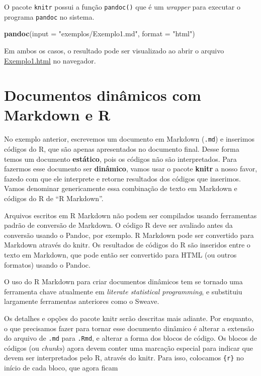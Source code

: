 \documentclass[10pt,a4paper]{book}
\newenvironment{Shaded}{\begin{snugshade}}{\end{snugshade}}
\newcommand{\KeywordTok}[1]{\textcolor[rgb]{0.13,0.29,0.53}{\textbf{#1}}}
\newcommand{\DataTypeTok}[1]{\textcolor[rgb]{0.13,0.29,0.53}{#1}}
\newcommand{\StringTok}[1]{\textcolor[rgb]{0.31,0.60,0.02}{#1}}
\newcommand{\NormalTok}[1]{#1}
\begin{document}
O pacote \texttt{knitr} possui a função \texttt{pandoc()} que é um
\emph{wrapper} para executar o programa \texttt{pandoc} no sistema.

\begin{Shaded}
\begin{Highlighting}[]
\KeywordTok{pandoc}\NormalTok{(}\DataTypeTok{input =} \StringTok{"exemplos/Exemplo1.md"}\NormalTok{, }\DataTypeTok{format =} \StringTok{"html"}\NormalTok{)}
\end{Highlighting}
\end{Shaded}

Em ambos os casos, o resultado pode ser visualizado ao abrir o arquivo
\href{exemplos/Exemplo1.html}{Exemplo1.html} no navegador.

\section{Documentos dinâmicos com Markdown e
R}\label{documentos-dinamicos-com-markdown-e-r}

No exemplo anterior, escrevemos um documento em Markdown (\texttt{.md})
e inserimos códigos do R, que são apenas apresentados no documento
final. Desse forma temos um documento \textbf{estático}, pois os códigos
não são interpretados. Para fazermos esse documento ser
\textbf{dinâmico}, vamos usar o pacote \textbf{knitr} a nosso favor,
fazedo com que ele interprete e retorne resultados dos códigos que
inserimos. Vamos denominar genericamente essa combinação de texto em
Markdown e códigos do R de ``R Markdown''.

Arquivos escritos em R Markdown não podem ser compilados usando
ferramentas padrão de conversão de Markdown. O código R deve ser
avaliado antes da conversão usando o Pandoc, por exemplo. R Markdown
pode ser convertido para Markdown através do knitr. Os resultados de
códigos do R são inseridos entre o texto em Markdown, que pode então ser
convertido para HTML (ou outros formatos) usando o Pandoc.

O uso do R Markdown para criar documentos dinâmicos tem se tornado uma
ferramenta chave atualmente em \emph{literate statistical programming},
e substituiu largamente ferramentas anteriores como o Sweave.

Os detalhes e opções do pacote knitr serão descritas mais adiante. Por
enquanto, o que precisamos fazer para tornar esse documento dinâmico é
alterar a extensão do arquivo de \texttt{.md} para \texttt{.Rmd}, e
alterar a forma dos blocos de código. Os blocos de códigos (ou
\emph{chunks}) agora devem conter uma marcação especial para indicar que
devem ser interpretados pelo R, através do knitr. Para isso, colocamos
\texttt{\{r\}} no início de cada bloco, que agora ficam
\end{document}
